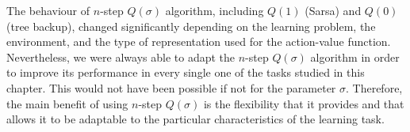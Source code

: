 The behaviour of $n$-step $Q(\sigma)$ algorithm, including $Q(1)$ (Sarsa) and $Q(0)$ (tree backup), changed significantly depending on the learning problem, the environment, and the type of representation used for the action-value function.
Nevertheless, we were always able to adapt the $n$-step $Q(\sigma)$ algorithm in order to improve its performance in every single one of the tasks studied in this chapter.
This would not have been possible if not for the parameter $\sigma$.
Therefore, the main benefit of using $n$-step $Q(\sigma)$ is the flexibility that it provides and that allows it to be adaptable to the particular characteristics of the learning task.

